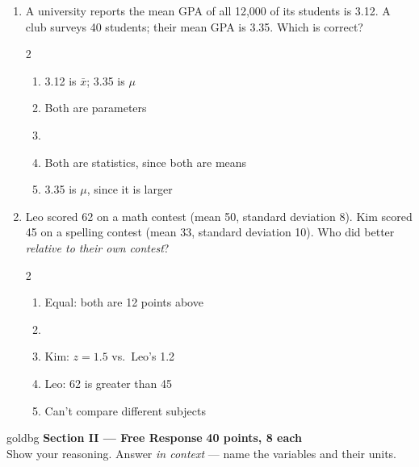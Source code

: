\documentclass[12pt]{article}
\newenvironment{choices}
  {\begin{enumerate}[label=\textbf{(\Alph*)}, leftmargin=2.2em, itemsep=0pt, topsep=1pt]}
  {\end{enumerate}}
\newcommand{\letterroom}{\rule[-15pt]{0pt}{36pt}}
\begin{document}
\begin{enumerate}[leftmargin=1.9em, itemsep=0.03in]
  \boxguard[10]
  \item A university reports the mean GPA of all 12,000 of its students is 3.12. A club surveys
        40 students; their mean GPA is 3.35. Which is correct?
        \begin{multicols}{2}
        \begin{choices}
          \item 3.12 is $\bar x$; 3.35 is $\mu$
          \item Both are parameters
          \item {}
          \item Both are statistics, since both are means
          \item 3.35 is $\mu$, since it is larger
                \hfill{}\letterroom
        \end{choices}
        \end{multicols}

  \boxguard[11]
  \item Leo scored 62 on a math contest (mean 50, standard deviation 8). Kim scored 45 on a
        spelling contest (mean 33, standard deviation 10). Who did better \emph{relative to
        their own contest}?
        \begin{multicols}{2}
        \begin{choices}
          \item Equal: both are 12 points above
          \item {}
          \item Kim: $z = 1.5$ vs.\ Leo's 1.2
          \item Leo: 62 is greater than 45
                \hfill{}\letterroom
          \item Can't compare different subjects
        \end{choices}
        \end{multicols}

\end{enumerate}

\vspace{0.08in}

\boxguard[12]
\begin{headlinebox}{goldbg}
\small
\textbf{Section II --- Free Response} \hfill \textbf{40 points, 8 each}\\
Show your reasoning. Answer \emph{in context} --- name the variables and their units.
\end{headlinebox}
\end{document}
